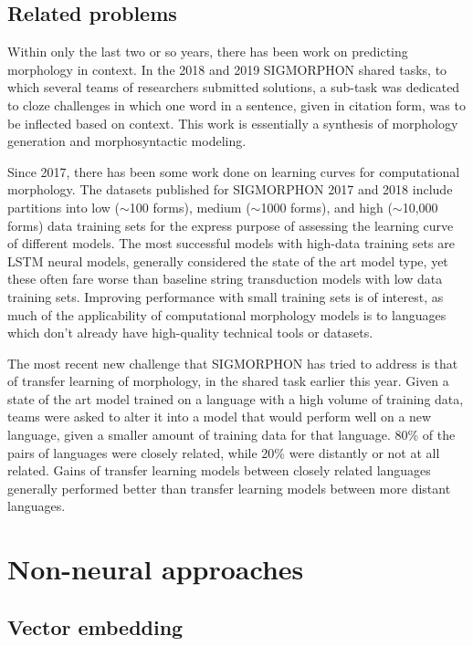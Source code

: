 \subsection{Related problems}

Within only the last two or so years, there has been work on predicting morphology in context. In the 2018 and 2019 SIGMORPHON shared tasks, to which several teams of researchers submitted solutions, a sub-task was dedicated to cloze challenges in which one word in a sentence, given in citation form, was to be inflected based on context. \parencite{Cotterell2018b} \parencite{McCarthy2019} This work is essentially a synthesis of morphology generation and morphosyntactic modeling.

Since 2017, there has been some work done on learning curves for computational morphology. The datasets published for SIGMORPHON 2017 and 2018 include partitions into low ($\sim$100 forms), medium ($\sim$1000 forms), and high ($\sim$10,000 forms) data training sets for the express purpose of assessing the learning curve of different models. The most successful models with high-data training sets are LSTM neural models, generally considered the state of the art model type, yet these often fare worse than baseline string transduction models with low data training sets. \parencite{Cotterell2017} \parencite{Cotterell2018b} Improving performance with small training sets is of interest, as much of the applicability of computational morphology models is to languages which don't already have high-quality technical tools or datasets. 

The most recent new challenge that SIGMORPHON has tried to address is that of transfer learning of morphology, in the shared task earlier this year. Given a state of the art model trained on a language with a high volume of training data, teams were asked to alter it into a model that would perform well on a new language, given a smaller amount of training data for that language. 80\% of the pairs of languages were closely related, while 20\% were distantly or not at all related. Gains of transfer learning models between closely related languages generally performed better than transfer learning models between more distant languages. \parencite{McCarthy2019} 

\section{Non-neural approaches}

\subsection{Vector embedding}

